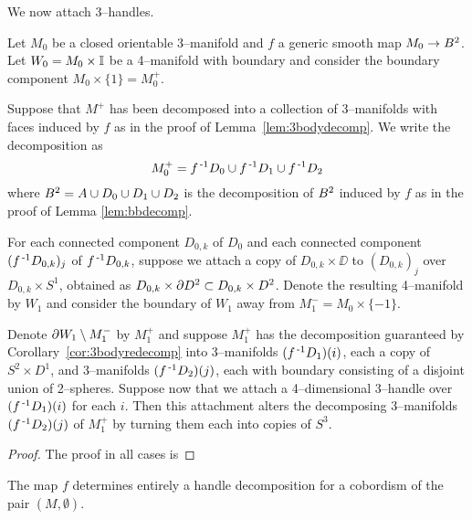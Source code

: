 We now attach 3--handles.

\begin{lem}
	\label{lem:3body3handle}
	Let $M_0$ be a closed orientable 3--manifold and $f$ a generic smooth map $M_0\to B^2$.
	Let $W_0=M_0\times\mathbb{I}$ be a 4--manifold with boundary and consider the boundary component $M_0\times\{1\}=M_0^+$.
	
	Suppose that $M^+$ has been decomposed into a collection of 3--manifolds with faces induced by $f$ as in the proof of Lemma~\ref{lem:3bodydecomp}.
	We write the decomposition as
	\[
	M_0^+ = f^{\,\text{-}1} D_0\cup f^{\,\text{-}1} D_1\cup f^{\,\text{-}1} D_2
	\]
	where $B^2=A\cup D_0\cup D_1\cup D_2$ is the decomposition of $B^2$ induced by $f$ as in the proof of Lemma \ref{lem:bbdecomp}.
	
	For each connected component $D_{0,k}$ of $D_0$ and each connected component $(f^{\,\text{-}1} D_{0,k})_j$ of $f^{\,\text{-}1} D_{0,k}$, suppose we attach a copy of $D_{0,k}\times\DD$ to $(D_{0,k})_j$ over $D_{0,k}\times S^1$, obtained as $D_{0,k}\times \partial D^2\subset D_{0,k}\times D^2$.
	Denote the resulting 4--manifold by $W_1$ and consider the boundary of $W_1$ away from $M_1^-=M_0\times\{-1\}$.
	
	Denote $\partial W_1\setminus M_1^-$ by $M_1^+$ and suppose $M_1^+$ has the decomposition guaranteed by Corollary~\ref{cor:3bodyredecomp} into 3--manifolds $(f^{\,\text{-}1} D_1)(i)$, each a copy of $S^2\times D^1$, and 3--manifolds $(f^{\,\text{-}1} D_2)(j)$, each with boundary consisting of a disjoint union of 2--spheres.
	Suppose now that we attach a 4--dimensional 3--handle over $(f^{\,\text{-}1} D_1)(i)$ for each $i$.
	Then this attachment alters the decomposing 3--manifolds $(f^{\,\text{-}1} D_2)(j)$ of $M_1^+$ by turning them each into copies of $S^3$.
\end{lem}

\begin{proof}
	The proof in all cases is 
	
	
\end{proof}















\begin{lem}
	


\end{lem}

\begin{theorem}
	\label{lem:3body4handle}
	\label{thm:3bound4}
	The map $f$ determines entirely a handle decomposition for a cobordism of the pair $(M,\emptyset)$.
\end{theorem}

